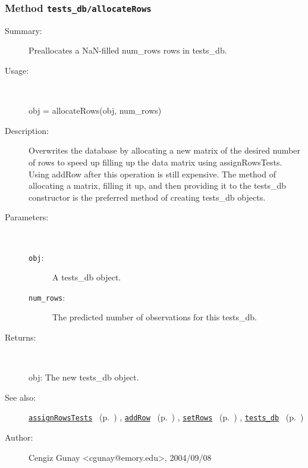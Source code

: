 \subsubsection[Method \texttt{allocateRows}]{Method \texttt{tests\_db/allocateRows}}%
%
\label{ref_tests_db__allocateRows}%
\hypertarget{ref_tests_db__allocateRows}{}%
\begin{description}
\item[Summary:]Preallocates a NaN-filled num\_rows rows in tests\_db.
%
\item[Usage:]~%
\begin{lyxcode}%
obj = allocateRows(obj, num\_rows)
%
\end{lyxcode}%
%
\item[Description:]%
Overwrites the database by allocating a new matrix of the desired number
 of rows to speed up filling up the data matrix using
 assignRowsTests. Using addRow after this operation is still expensive.
 The method of allocating a matrix, filling it up, and then providing it to
 the tests\_db constructor is the preferred method of creating tests\_db
 objects.
\item[Parameters:]~
\begin{description}%
\item[\texttt{obj}:]
 A tests\_db object.
\item[\texttt{num\_rows}:]
 The predicted number of observations for this tests\_db.
\end{description}%
%
\item[Returns:
]~

	obj: The new tests\_db object.
%
%
\item[See also:]%
\hyperlink{ref_assignRowsTests}{\texttt{assignRowsTests}}%
\ (p.~\pageref{ref_assignRowsTests})%
%
, \hyperlink{ref_addRow}{\texttt{addRow}}%
\ (p.~\pageref{ref_addRow})%
%
, \hyperlink{ref_setRows}{\texttt{setRows}}%
\ (p.~\pageref{ref_setRows})%
%
, \hyperlink{ref_tests_db}{\texttt{tests\_db}}%
\ (p.~\pageref{ref_tests_db})%
%
%
\item[Author:]%
Cengiz Gunay <cgunay@emory.edu>, 2004/09/08
%
\end{description}
\methodline%
